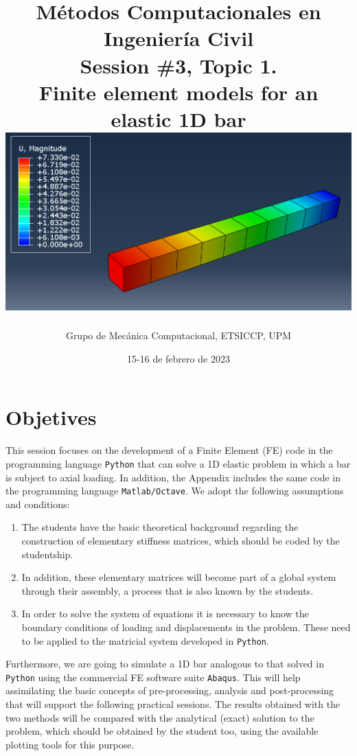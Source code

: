 \documentclass[spanish,a4paper,12pt]{article}
\title{\vspace*{-4ex}
	\bf\normalsize
	Métodos Computacionales en Ingeniería Civil\\
	\Large
	Session \#3, Topic 1.\\
	Finite element models for an elastic 1D bar\\[3ex]
	\includegraphics[width=0.65\linewidth]{figuras/barra_portada.png}%
	}
\author{%
        {\small\sc 
	Grupo de Mecánica Computacional, ETSICCP, UPM}}
\date{15-16 de febrero de 2023}
\begin{document}
\pagestyle{fancy}
\lhead[\fancyplain{}{\thepage}]{\fancyplain{}{\rightmark}}
\rhead[\fancyplain{}{\leftmark}]{\fancyplain{}{\thepage}}
\cfoot[\fancyplain{\thepage}{}]{\fancyplain{\thepage}{}}

\renewcommand{\sectionmark}[1]{\markright{\sf Aptdo.\ \thesection. #1}{}}
\renewcommand*\lstlistingname{Código}

\maketitle

\tableofcontents


\clearpage

\section{Objetives}
\label{sec:objetivos}

This session focuses on the development of a Finite Element (FE) code in the programming language \texttt{Python} that can solve a 1D elastic problem in which a bar is subject to axial loading. In addition, the Appendix includes the same code in the programming language \texttt{Matlab/Octave}. We adopt the following assumptions and conditions:
\begin{enumerate}
	\item
	The students have the basic theoretical background regarding the construction of elementary stiffness matrices, which should be coded by the studentship. 
	\item
	In addition, these elementary matrices will become part of a global system through their assembly, a process that is also known by the students. 
	\item
	In order to solve the system of equations it is necessary to know the boundary conditions of loading and displacements in the problem. These need to be applied to the matricial system developed in \texttt{Python}.
\end{enumerate}

Furthermore, we are going to simulate a 1D bar analogous to that solved in \texttt{Python} using the commercial FE software suite \texttt{Abaqus}. This will help assimilating the basic concepts of pre-processing, analysis and post-processing that will support the following practical sessions. The results obtained with the two methods will be compared with the analytical (exact) solution to the problem, which should be obtained by the student too, using the available plotting tools for this purpose.
\end{document}
